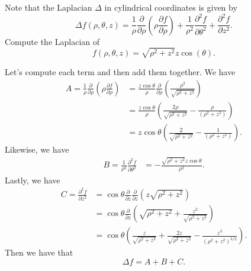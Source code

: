 \documentclass[12pt]{article} %
\begin{document}
\newpage
\begin{problem}
    Note that the Laplacian $\Delta$ in cylindrical coordinates is given by
    \[
        \Delta f(\rho,\theta,z) = \frac{1}{\rho} \frac{\partial}{\partial \rho} \left(\rho \frac{\partial f}{\partial \rho}\right)+\frac{1}{\rho^2}\frac{\partial^2 f}{\partial \theta^2} + \frac{\partial^2 f}{\partial z^2}.
    \]
    Compute the Laplacian of
    \[
        f(\rho,\theta,z) = \sqrt{\rho^2+z^2} z \cos(\theta).
    \]
\end{problem}
\begin{solution}
Let's compute each term and then add them together. We have
\begin{align*}
    A=\frac{1}{\rho}\frac{\partial}{\partial \rho} \left(\rho \frac{\partial f}{\partial \rho} \right) &=  \frac{z\cos \theta}{\rho} \frac{\partial}{\partial \rho} \left( \frac{\rho^2}{\sqrt{\rho^2+z^2}} \right)\\
    &=\frac{z\cos \theta}{\rho} \left(\frac{2\rho}{\sqrt{\rho^2+z^2}}-\frac{\rho}{\left(\rho^2+z^2\right)}\right)\\
    &= z\cos \theta \left( \frac{2}{\sqrt{\rho^2+z^2}} - \frac{1}{\left(\rho^2+z^2\right)}\right).
\end{align*}
Likewise, we have
\begin{align*}
    B=\frac{1}{\rho^2} \frac{\partial^2 f}{\partial \theta^2} &= -\frac{\sqrt{\rho^2+z^2}z\cos\theta}{\rho^2}.
\end{align*}  
Lastly, we have
\begin{align*}
    C=\frac{\partial^2 f}{\partial z^2} &= \cos \theta \frac{\partial}{\partial z}\frac{\partial}{\partial z} \left( z \sqrt{\rho^2+z^2}\right)\\
    &= \cos \theta \frac{\partial}{\partial z} \left( \sqrt{\rho^2+z^2}+ \frac{z^2}{\sqrt{\rho^2+z^2}}\right)\\
    &= \cos \theta \left(\frac{z}{\sqrt{\rho^2+z^2}}+\frac{2z}{\sqrt{\rho^2+z^2}}-\frac{z^3}{\left(\rho^2+z^2\right)^{3/2}}\right).
\end{align*}
Then we have that
\[
\Delta f = A+B+C.
\]
\end{solution}
\end{document}
